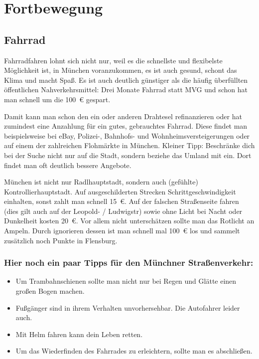 ﻿
\chapter{Fortbewegung}

\section{Fahrrad}

Fahrradfahren lohnt sich nicht nur, weil es die schnellste und
flexibelste Möglichkeit ist, in München voranzukommen, es ist auch
gesund, schont das Klima und macht Spaß.  Es ist auch deutlich
günstiger als die häufig überfüllten öffentlichen Nahverkehrsmittel:
Drei Monate Fahrrad statt MVG und schon hat man schnell um die 100~€
gespart.

Damit kann man schon den ein oder anderen Drahtesel refinanzieren oder
hat zumindest eine Anzahlung für ein gutes, gebrauchtes Fahrrad. Diese
findet man beispielsweise bei eBay, Polizei-, Bahnhofs- und
Wohnheimsversteigerungen oder auf einem der zahlreichen Flohmärkte in
München. Kleiner Tipp: Beschränke dich bei der Suche nicht nur auf die
Stadt, sondern beziehe das Umland mit ein. Dort findet man oft
deutlich bessere Angebote.

München ist nicht nur Radlhauptstadt, sondern auch (gefühlte) Kontrollierhauptstadt. Auf ausgeschilderten Strecken Schrittgeschwindigkeit einhalten, sonst zahlt man schnell 15~€. Auf der falschen Straßenseite fahren (dies gilt auch auf der Leopold- / Ludwigstr) sowie ohne Licht bei Nacht oder Dunkelheit kosten 20~€.
Vor allem nicht unterschätzen sollte man das Rotlicht an Ampeln. Durch ignorieren dessen ist man schnell mal 100~€ los und sammelt zusätzlich noch Punkte in Flensburg.

\subsection*{Hier noch ein paar Tipps für den Münchner Straßenverkehr:}
\begin{itemize}
	\item Um Trambahnschienen sollte man nicht nur bei Regen und Glätte einen großen Bogen machen.
	\item Fußgänger sind in ihrem Verhalten unvorhersehbar. Die Autofahrer leider auch.
	\item Mit Helm fahren kann dein Leben retten.
	\item Um das Wiederfinden des Fahrrades zu erleichtern, sollte man es abschließen.
	
\end{itemize}

